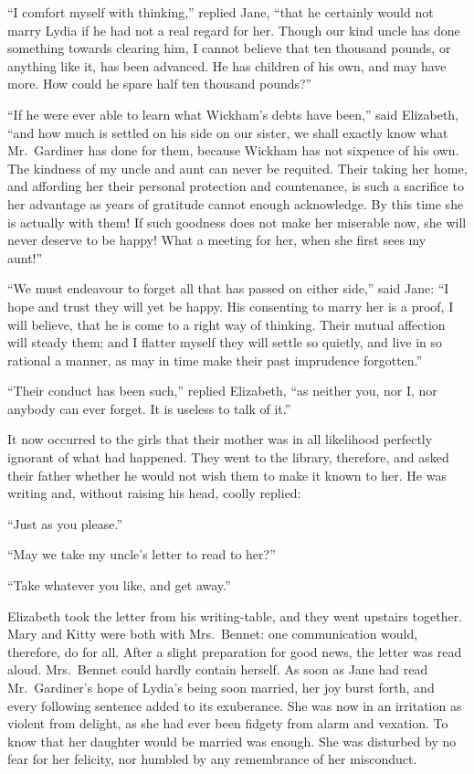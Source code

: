 \documentclass[12pt,english]{book}
\begin{document}
{}``I comfort myself with thinking,'' replied Jane, {}``that he
certainly would not marry Lydia if he had not a real regard for her.
Though our kind uncle has done something towards clearing him, I cannot
believe that ten thousand pounds, or anything like it, has been advanced.
He has children of his own, and may have more. How could he spare
half ten thousand pounds?''\ 

{}``If he were ever able to learn what Wickham's debts have been,''
said Elizabeth, {}``and how much is settled on his side on our sister,
we shall exactly know what Mr.\ Gardiner has done for them, because
Wickham has not sixpence of his own. The kindness of my uncle and
aunt can never be requited. Their taking her home, and affording her
their personal protection and countenance, is such a sacrifice to
her advantage as years of gratitude cannot enough acknowledge. By
this time she is actually with them! If such goodness does not make
her miserable now, she will never deserve to be happy! What a meeting
for her, when she first sees my aunt!''\ 

{}``We must endeavour to forget all that has passed on either side,''
said Jane: {}``I hope and trust they will yet be happy. His consenting
to marry her is a proof, I will believe, that he is come to a right
way of thinking. Their mutual affection will steady them; and I flatter
myself they will settle so quietly, and live in so rational a manner,
as may in time make their past imprudence forgotten.''

{}``Their conduct has been such,'' replied Elizabeth, {}``as neither
you, nor I, nor anybody can ever forget. It is useless to talk of
it.''

It now occurred to the girls that their mother was in all likelihood
perfectly ignorant of what had happened. They went to the library,
therefore, and asked their father whether he would not wish them to
make it known to her. He was writing and, without raising his head,
coolly replied:

{}``Just as you please.''

{}``May we take my uncle's letter to read to her?''\ 

{}``Take whatever you like, and get away.''

Elizabeth took the letter from his writing-table, and they went upstairs
together. Mary and Kitty were both with Mrs.\ Bennet: one communication
would, therefore, do for all. After a slight preparation for good
news, the letter was read aloud. Mrs.\ Bennet could hardly contain
herself. As soon as Jane had read Mr.\ Gardiner's hope of Lydia's
being soon married, her joy burst forth, and every following sentence
added to its exuberance. She was now in an irritation as violent from
delight, as she had ever been fidgety from alarm and vexation. To
know that her daughter would be married was enough. She was disturbed
by no fear for her felicity, nor humbled by any remembrance of her
misconduct.
\end{document}
